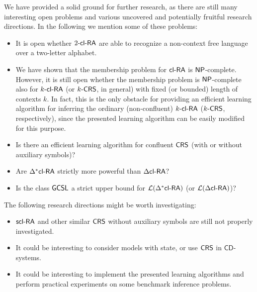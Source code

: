 We have provided a solid ground for further research, as there are still many interesting open problems and various uncovered and potentially fruitful research directions. In the following we mention some of these problems:

\begin{itemize}
\item It is open whether $\kclRA[2]$ are able to recognize a non-context free language over a two-letter alphabet.
\item We have shown that the membership problem for $\clRA$ is $\classNP$-complete. However, it is still open whether the membership problem is $\classNP$-complete also for $\kclRA$ (or $\kCRS$, in general) with fixed (or bounded) length of contexts $k$. In fact, this is the only obstacle for providing an efficient learning algorithm for inferring the ordinary (non-confluent) $\kclRA$ ($\kCRS$, respectively), since the presented learning algorithm can be easily modified for this purpose.
\item Is there an efficient learning algorithm for confluent $\CRS$ (with or without auxiliary symbols)?
\item Are $\DXclRA$ strictly more powerful than $\DclRA$?
\item Is the class $\GCSL$ a strict upper bound for $\calL{\DXclRA}$ (or $\calL{\DclRA}$)?
\end{itemize}
%
The following research directions might be worth investigating:
%
\begin{itemize}
\item $\sclRA$ and other similar $\CRS$ without auxiliary symbols are still not properly investigated.
\item It could be interesting to consider models with state, or use $\CRS$ in $\mathsf{CD}$-systems.
\item It could be interesting to implement the presented learning algorithms and perform practical experiments on some benchmark inference problems.
\end{itemize}